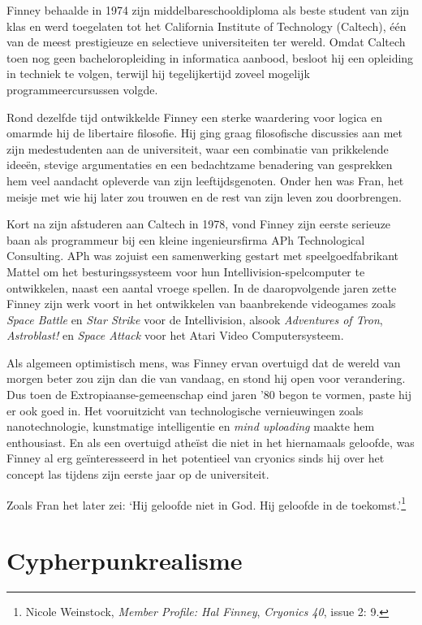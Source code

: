 \documentclass[
  a5paper,
  smalldemyvopaper,11pt,twoside,onecolumn,openright,extrafontsizes,
hidelinks]{memoir}
\begin{document}
Finney behaalde in 1974 zijn middelbareschooldiploma als beste student
van zijn klas en werd toegelaten tot het California Institute of
Technology (Caltech), één van de meest prestigieuze en selectieve
universiteiten ter wereld. Omdat Caltech toen nog geen bacheloropleiding
in informatica aanbood, besloot hij een opleiding in techniek te volgen,
terwijl hij tegelijkertijd zoveel mogelijk programmeercursussen volgde.

Rond dezelfde tijd ontwikkelde Finney een sterke waardering voor logica
en omarmde hij de libertaire filosofie. Hij ging graag filosofische
discussies aan met zijn medestudenten aan de universiteit, waar een
combinatie van prikkelende ideeën, stevige argumentaties en een
bedachtzame benadering van gesprekken hem veel aandacht opleverde van
zijn leeftijdsgenoten. Onder hen was Fran, het meisje met wie hij later
zou trouwen en de rest van zijn leven zou doorbrengen.

Kort na zijn afstuderen aan Caltech in 1978, vond Finney zijn eerste
serieuze baan als programmeur bij een kleine ingenieursfirma APh
Technological Consulting. APh was zojuist een samenwerking gestart met
speelgoedfabrikant Mattel om het besturingssysteem voor hun
Intellivision-spelcomputer te ontwikkelen, naast een aantal vroege
spellen. In de daaropvolgende jaren zette Finney zijn werk voort in het
ontwikkelen van baanbrekende videogames zoals \emph{Space Battle} en
\emph{Star Strike} voor de Intellivision, alsook \emph{Adventures of
Tron}, \emph{Astroblast!} en \emph{Space Attack} voor het Atari Video
Computersysteem.

Als algemeen optimistisch mens, was Finney ervan overtuigd dat de wereld
van morgen beter zou zijn dan die van vandaag, en stond hij open voor
verandering. Dus toen de Extropiaanse-gemeenschap eind jaren '80 begon
te vormen, paste hij er ook goed in. Het vooruitzicht van technologische
vernieuwingen zoals nanotechnologie, kunstmatige intelligentie en
\emph{mind uploading} maakte hem enthousiast. En als een overtuigd
atheïst die niet in het hiernamaals geloofde, was Finney al erg
geïnteresseerd in het potentieel van cryonics sinds hij over het concept
las tijdens zijn eerste jaar op de universiteit.

Zoals Fran het later zei: `Hij geloofde niet in God. Hij geloofde in de
toekomst.'\footnote{Nicole Weinstock, \emph{Member Profile: Hal Finney},
  \emph{Cryonics 40}, issue 2: 9.}

\section{Cypherpunkrealisme}\label{cypherpunkrealisme}
\end{document}
